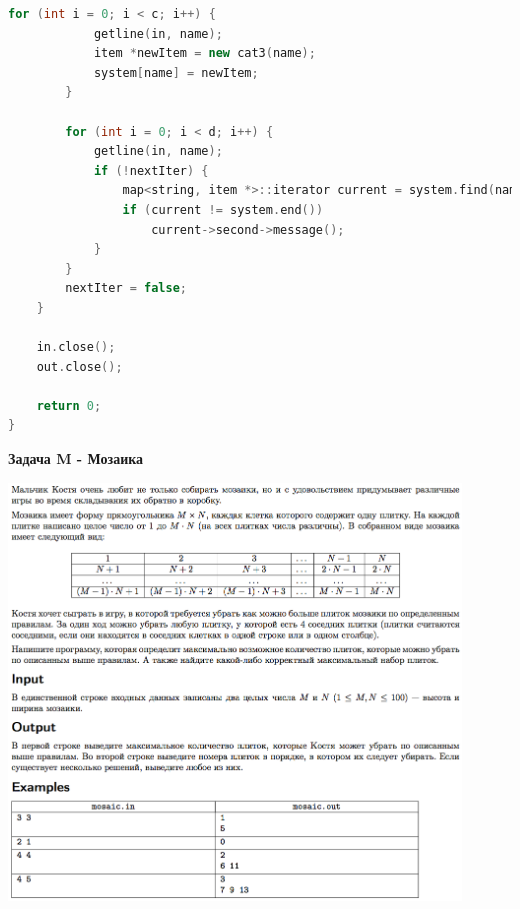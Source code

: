 \documentclass[a4paper,12pt]{article}
\begin{document}
\begin{lstlisting}[language=C++]
        for (int i = 0; i < c; i++) {
            getline(in, name);
            item *newItem = new cat3(name);
            system[name] = newItem;
        }

        for (int i = 0; i < d; i++) {
            getline(in, name);
            if (!nextIter) {
                map<string, item *>::iterator current = system.find(name);
                if (current != system.end())
                    current->second->message();
            }
        }
        nextIter = false;
    }

    in.close();
    out.close();

    return 0;
}
\end{lstlisting}

\textbf{{\large Задача M - Мозаика}} \\
\begin{center}
\includegraphics[width=0.9\textwidth]{OC_Northern/OC_Northern_M.png}\\ [1cm]
\end{center}
\newpage
\end{document}
